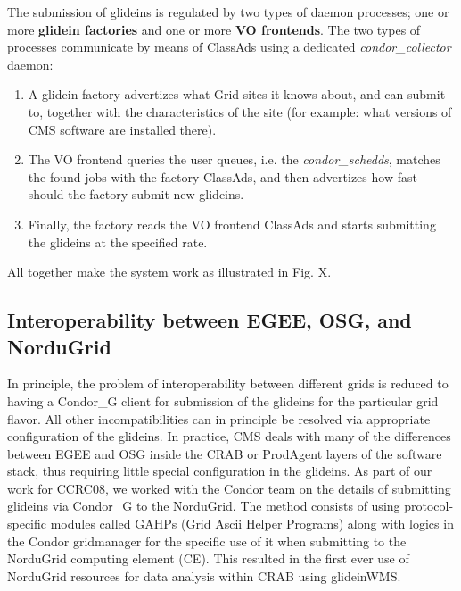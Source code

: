 \documentclass[a4paper]{jpconf}
\begin{document}
The submission of glideins is regulated by two types of daemon processes; 
one or more \textbf{glidein factories} and one or more \textbf{VO frontends}. 
The two types of processes communicate by means of ClassAds using a dedicated \emph{condor\_collector} daemon:
\begin{enumerate}
\item A glidein factory advertizes what Grid sites it knows about, and can submit to, together with the characteristics of the site 
(for example: what versions of CMS software are installed there).
\item The VO frontend queries the user queues, i.e. the \emph{condor\_schedds}, 
matches the found jobs with the factory ClassAds, 
and then advertizes how fast should the factory submit new glideins.
\item Finally, the factory reads the VO frontend ClassAds and starts submitting the glideins at the specified rate.
\end{enumerate}

All together make the system work as illustrated in Fig. X.

\subsection {Interoperability between EGEE, OSG, and NorduGrid}
In principle, the problem of interoperability between different grids is reduced to having a Condor\_G client
for submission of the glideins for the particular grid flavor. All other incompatibilities can in principle be 
resolved via appropriate configuration of the glideins. In practice, CMS deals with many of the differences 
between EGEE and OSG inside the CRAB or ProdAgent layers of the software stack, thus requiring little special 
configuration in the glideins. As part of our work for CCRC08, we worked with the Condor team
on the details of submitting glideins via Condor\_G to the NorduGrid. The method consists of using protocol-specific 
modules called GAHPs (Grid Ascii Helper Programs) along with logics in the Condor gridmanager for the 
specific use of it when submitting to the NorduGrid computing element (CE). This resulted in the first ever use of 
NorduGrid resources for data analysis within CRAB using glideinWMS.
\end{document}
